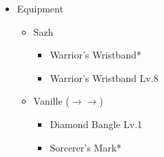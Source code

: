 \begin{menu}
	\begin{itemize}
		\item Equipment
			\begin{itemize}
				\item Sazh
					\begin{itemize}
						\item Warrior's Wristband*
						\item Warrior's Wristband Lv.8
					\end{itemize}
				\item Vanille ($\rightarrow\rightarrow$)
					\begin{itemize}
						\item Diamond Bangle Lv.1
						\item Sorcerer's Mark*
					\end{itemize}
			\end{itemize}
	\end{itemize}
\end{menu}

